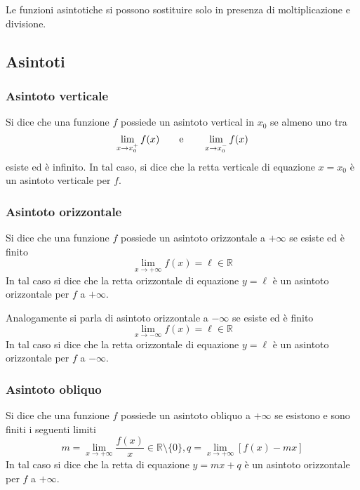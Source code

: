 \documentclass[11pt]{book}
\begin{document}
Le funzioni asintotiche si possono sostituire solo in presenza di moltiplicazione e divisione.
\subsection{Asintoti}
\subsubsection*{Asintoto verticale}
Si dice che una funzione $f$ possiede un asintoto vertical in $x_0$ se almeno uno tra 
\begin{equation*}
    \lim_{x\rightarrow x_0^+}f(x)\qquad\textnormal{e}\qquad\lim_{x\rightarrow x_0^-}f(x)
\end{equation*}
esiste ed è infinito. In tal caso, si dice che la retta verticale di equazione $x=x_0$ è un asintoto verticale per $f$.
\subsubsection*{Asintoto orizzontale}
Si dice che una funzione $f$ possiede un asintoto orizzontale a $+\infty$ se esiste ed è finito
\begin{equation*}
    \lim_{x\rightarrow +\infty}f(x)=\ell\in\mathbb{R}
\end{equation*}
In tal caso si dice che la retta orizzontale di equazione $y=\ell$ è un asintoto orizzontale per $f$ a $+\infty$.

Analogamente si parla di asintoto orizzontale a $-\infty$ se esiste ed è finito
\begin{equation*}
    \lim_{x\rightarrow -\infty}f(x)=\ell\in\mathbb{R}
\end{equation*}
In tal caso si dice che la retta orizzontale di equazione $y=\ell$ è un asintoto orizzontale per $f$ a $-\infty$.
\subsubsection*{Asintoto obliquo}
Si dice che una funzione $f$ possiede un asintoto obliquo a $+\infty$ se esistono e sono finiti i seguenti limiti
\begin{equation*}
    m=\lim_{x\rightarrow +\infty}\frac{f(x)}{x}\in\mathbb{R}\setminus\{0\}, q=\lim_{x\rightarrow +\infty}[f(x)-mx]
\end{equation*}
In tal caso si dice che la retta di equazione $y=mx+q$ è un asintoto orizzontale per $f$ a $+\infty$.
\end{document}
